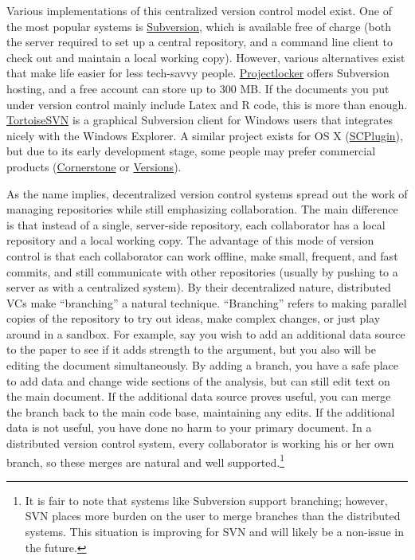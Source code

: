 \documentclass[]{article}
\begin{document}
Various implementations of this centralized version control model exist. One of the most 
popular systems is \href{http://subversion.tigris.org/}{Subversion}, which is available 
free of charge (both the server required to set up a central repository, and a command 
line client to check out and maintain a local working copy). However, various 
alternatives exist that make life easier for less tech-savvy people. \href{http://
www.projectlocker.com/}{Projectlocker} offers Subversion hosting, and a free account 
can store up to 300 MB. If the documents you put under version control mainly include 
Latex and R code, this is more than enough. \href{http://tortoisesvn.tigris.org/}
{TortoiseSVN} is a graphical Subversion client for Windows users that integrates nicely 
with the Windows Explorer. A similar project exists for OS X (\href{http://
scplugin.tigris.org/}{SCPlugin}), but due to its early development stage, some people 
may prefer commercial products (\href{http://www.zennaware.com/cornerstone/}
{Cornerstone} or \href{http://versionsapp.com/}{Versions}). 

As the name implies, decentralized version control systems spread out the work
of managing repositories while still emphasizing collaboration. The main
difference is that instead of a single, server-side repository, each
collaborator has a local repository and a local working copy. The advantage of
this mode of version control is that each collaborator can work offline, make
small, frequent, and fast commits, and still communicate with other
repositories (usually by pushing to a server as with a centralized system).
By their decentralized nature,  distributed VCs make ``branching'' a natural
technique. ``Branching'' refers to making parallel copies of the repository to
try out ideas, make complex changes, or just play around in a sandbox. For
example, say you wish to add an additional data source to the paper to see if
it adds strength to the argument, but you also will be editing the document
simultaneously. By adding a branch, you have a safe place to add data and
change wide sections of the analysis, but can still edit text on the main
document. If the additional data source proves useful, you can merge the
branch back to the main code base, maintaining any edits. If the additional
data is not useful, you have done no harm to your primary document. In a
distributed version control system, every collaborator is working his or her
own branch, so these merges are natural and well supported.\footnote{It is
fair to note that systems like Subversion support branching; however, SVN
places more burden on the user to merge branches than the distributed systems.
This situation is improving for SVN and will likely be a non-issue in the
future.}
\end{document}

